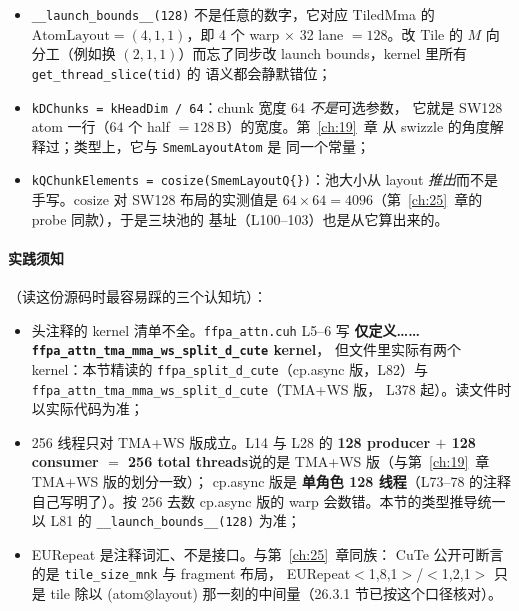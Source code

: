 \begin{itemize}[itemsep=2pt,topsep=2pt]
  \item \texttt{\_\allowbreak{}\_\allowbreak{}launch\_\allowbreak{}bounds\_\allowbreak{}\_\allowbreak{}(128)} 不是任意的数字，它对应
        TiledMma 的 $\mathrm{AtomLayout}=(4,1,1)$，即 4 个 warp $\times$ 32 lane
        $=128$。改 Tile 的 $M$ 向分工（例如换 $(2,1,1)$）而忘了同步改
        launch bounds，kernel 里所有 \texttt{get\_\allowbreak{}thread\_\allowbreak{}slice(tid)} 的
        语义都会静默错位；
  \item \texttt{kDChunks = kHeadDim / 64}：chunk 宽度 64 \emph{不是}可选参数，
        它就是 SW128 atom 一行（$64$ 个 half $=128$\,B）的宽度。第~\ref{ch:19}~章
        从 swizzle 的角度解释过；类型上，它与 \texttt{Smem\allowbreak{}Layout\allowbreak{}Atom} 是
        同一个常量；
  \item \texttt{k\allowbreak{}QChunk\allowbreak{}Elements =\allowbreak{} cosize\allowbreak{}(Smem\allowbreak{}Layout\allowbreak{}Q\{\})}：池大小从 layout
        \emph{推出}而不是手写。$\mathrm{cosize}$ 对 SW128 布局的实测值是
        $64\times64=4096$（第~\ref{ch:25}~章的 probe 同款），于是三块池的
        基址（L100--103）也是从它算出来的。
\end{itemize}

\paragraph{实践须知}（读这份源码时最容易踩的三个认知坑）：

\begin{itemize}[itemsep=2pt,topsep=2pt]
  \item 头注释的 kernel 清单不全。\texttt{ffpa\_\allowbreak{}attn.\allowbreak{}cuh} L5--6 写
        \textbf{仅定义……\texttt{ffpa\_\allowbreak{}attn\_\allowbreak{}tma\_\allowbreak{}mma\_\allowbreak{}ws\_\allowbreak{}split\_\allowbreak{}d\_\allowbreak{}cute} kernel}，
        但文件里实际有两个 kernel：本节精读的
        \texttt{ffpa\_\allowbreak{}split\_\allowbreak{}d\_\allowbreak{}cute}（cp.async 版，L82）与
        \texttt{ffpa\_\allowbreak{}attn\_\allowbreak{}tma\_\allowbreak{}mma\_\allowbreak{}ws\_\allowbreak{}split\_\allowbreak{}d\_\allowbreak{}cute}（TMA+WS 版，
        L378 起）。读文件时以实际代码为准；
  \item 256 线程只对 TMA+WS 版成立。L14 与 L28 的
        \textbf{128 producer $+$ 128 consumer $=$ 256 total threads}说的是
        TMA+WS 版（与第~\ref{ch:19}~章 TMA+WS 版的划分一致）；
        cp.async 版是
        \textbf{单角色 128 线程}（L73--78 的注释自己写明了）。按 256 去数
        cp.async 版的 warp 会数错。本节的类型推导统一以 L81 的
        \texttt{\_\allowbreak{}\_\allowbreak{}launch\_\allowbreak{}bounds\_\allowbreak{}\_\allowbreak{}(128)} 为准；
  \item EURepeat 是注释词汇、不是接口。与第~\ref{ch:25}~章同族：
        CuTe 公开可断言的是 \texttt{tile\_\allowbreak{}size\_\allowbreak{}mnk} 与 fragment 布局，
        EURepeat$<$1,8,1$>$/$<$1,2,1$>$ 只是 tile 除以
        (atom$\otimes$layout) 那一刻的中间量（26.3.1 节已按这个口径核对）。
\end{itemize}

